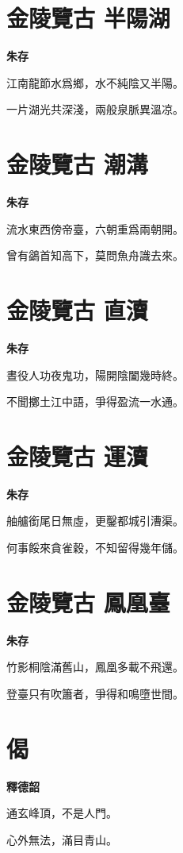 \documentclass[12pt,a4paper]{ctexbook}
\begin{document}
\section{金陵覽古 半陽湖}
\textbf{朱存}\par\vspace{0.5em}
江南龍節水爲鄉，水不純陰又半陽。\par
一片湖光共深淺，兩般泉脈異溫凉。\par

\section{金陵覽古 潮溝}
\textbf{朱存}\par\vspace{0.5em}
流水東西傍帝臺，六朝重爲兩朝開。\par
曾有鷁首知高下，莫問魚舟識去來。\par

\section{金陵覽古 直瀆}
\textbf{朱存}\par\vspace{0.5em}
晝役人功夜鬼功，陽開陰闔幾時終。\par
不聞擲土江中語，爭得盈流一水通。\par

\section{金陵覽古 運瀆}
\textbf{朱存}\par\vspace{0.5em}
舳艫銜尾日無虛，更鑿都城引漕渠。\par
何事餒來貪雀穀，不知留得幾年儲。\par

\section{金陵覽古 鳳凰臺}
\textbf{朱存}\par\vspace{0.5em}
竹影桐陰滿舊山，鳳凰多載不飛還。\par
登臺只有吹簫者，爭得和鳴墮世間。\par

\section{偈}
\textbf{釋德韶}\par\vspace{0.5em}
通玄峰頂，不是人門。\par
心外無法，滿目青山。\par
\end{document}
